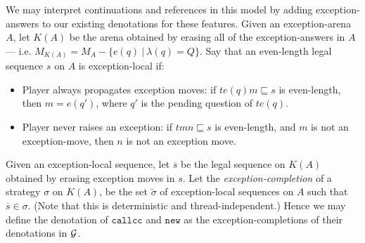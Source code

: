 \documentclass{eptcs}
\def\G{{\cal{G}}}
\newcommand{\callcc}{{\mathtt{callcc}}}
\newcommand{\new}{{\mathtt{new}}}
\begin{document}
{We may interpret continuations and references in this model by adding exception-answers to our existing denotations for these features.    
Given an exception-arena $A$, let $K(A)$ be the arena obtained by erasing all of the exception-answers in $A$ --- i.e. $M_{K(A)} = M_{A} - \{e(q)\ |\ \lambda(q) = Q\}$. Say that an even-length  legal sequence $s$ on $A$ is exception-local if:
\begin{itemize}
\item Player always propagates exception moves: if $te(q)m \sqsubseteq s$ is even-length, then $m = e(q')$, where $q'$ is the pending question of $te(q)$.
\item Player never raises an exception: if $tmn \sqsubseteq s$ is even-length, and $m$ is not an exception-move, then $n$ is not an exception move.
\end{itemize}
Given an exception-local sequence, let $\overline{s}$ be the legal sequence on $K(A)$ obtained by erasing exception moves in $s$. Let the \emph{exception-completion} of a strategy $\sigma$ on $K(A)$,  be the set $\widetilde{\sigma}$  of exception-local sequences on $A$ such that $\overline{s} \in \sigma$. (Note that this is deterministic and thread-independent.) Hence we may define the denotation of $\callcc$ and $\new$ as the exception-completions of their denotations in $\G$.




}
\end{document}

